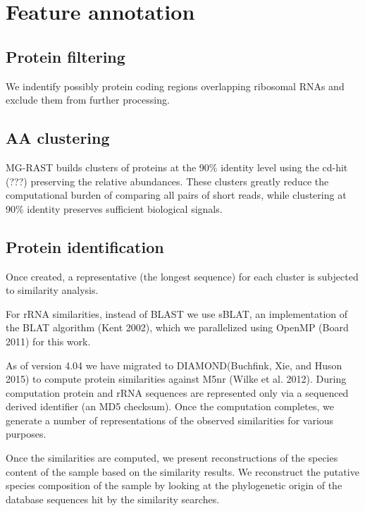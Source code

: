 \documentclass[letterpaper,10pt,english]{sphinxmanual}
\begin{document}
\section{Feature annotation}
\label{\detokenize{user_manual:feature-annotation}}

\subsection{Protein filtering}
\label{\detokenize{user_manual:protein-filtering}}
We indentify possibly protein coding regions overlapping ribosomal RNAs
and exclude them from further processing.


\subsection{AA clustering}
\label{\detokenize{user_manual:aa-clustering}}
MG-RAST builds clusters of proteins at the 90\% identity level using the
cd-hit (???) preserving the relative abundances. These clusters greatly
reduce the computational burden of comparing all pairs of short reads,
while clustering at 90\% identity preserves sufficient biological
signals.


\subsection{Protein identification}
\label{\detokenize{user_manual:protein-identification}}
Once created, a representative (the longest sequence) for each cluster
is subjected to similarity analysis.

For rRNA similarities, instead of BLAST we use sBLAT, an implementation
of the BLAT algorithm (Kent 2002), which we parallelized using OpenMP
(Board 2011) for this work.

As of version 4.04 we have migrated to DIAMOND(Buchfink, Xie, and Huson
2015) to compute protein similarities against M5nr (Wilke et al. 2012).
During computation protein and rRNA sequences are represented only via a
sequenced derived identifier (an MD5 checksum). Once the computation
completes, we generate a number of representations of the observed
similarities for various purposes.

Once the similarities are computed, we present reconstructions of the
species content of the sample based on the similarity results. We
reconstruct the putative species composition of the sample by looking at
the phylogenetic origin of the database sequences hit by the similarity
searches.
\end{document}
